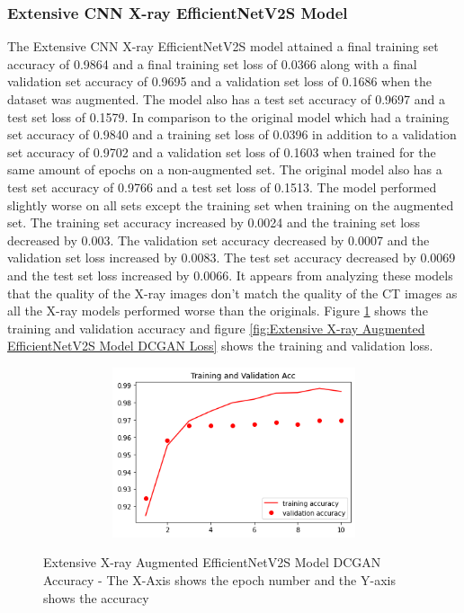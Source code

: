 \subsubsection{Extensive CNN X-ray EfficientNetV2S Model}
The Extensive CNN X-ray EfficientNetV2S model attained a final training set accuracy of 0.9864 and a final training set loss of 0.0366 along with a final validation set accuracy of 0.9695 and a validation set loss of 0.1686 when the dataset was augmented.  The model also has a test set accuracy of 0.9697 and a test set loss of 0.1579.  In comparison to the original model which had a training set accuracy of 0.9840 and a training set loss of 0.0396 in addition to a validation set accuracy of 0.9702 and a validation set loss of 0.1603 when trained for the same amount of epochs on a non-augmented set.  The original model also has a test set accuracy of 0.9766 and a test set loss of 0.1513.  The model performed slightly worse on all sets except the training set when training on the augmented set.  The training set accuracy increased by 0.0024 and the training set loss decreased by 0.003. The validation set accuracy decreased by 0.0007 and the validation set loss increased by 0.0083.  The test set accuracy decreased by 0.0069 and the test set loss increased by 0.0066.  It appears from analyzing these models that the quality of the X-ray images don't match the quality of the CT images as all the X-ray models performed worse than the originals. Figure \ref{fig:Extensive X-ray Augmented EfficientNetV2S Model DCGAN Accuracy} shows the training and validation accuracy and figure \ref{fig:Extensive X-ray Augmented EfficientNetV2S Model DCGAN Loss} shows the training and validation loss.
 \begin{figure}[H]
    \centering    \includegraphics[width=1\textwidth,height=5cm,keepaspectratio]{Images/EfficientNetV2SBaselineTrainingValidationAccuracyExtensiveXRayAugmentedDCGAN.png}\\
    \caption{Extensive X-ray Augmented EfficientNetV2S Model DCGAN Accuracy - The X-Axis shows the epoch number and the Y-axis shows the accuracy}
    \label{fig:Extensive X-ray Augmented EfficientNetV2S Model DCGAN Accuracy}
\end{figure}
